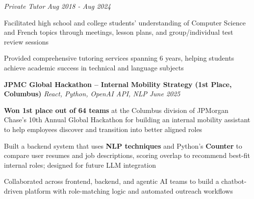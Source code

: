 \documentclass[letterpaper]{article}
\begin{document}
    \textit{Private Tutor} \hfill \textsl{Aug 2018 - Aug 2024}\\
    \vspace{-7pt}
    \begin{tightitemize} \itemsep -1mm
        
            \item Facilitated high school and college students' understanding of Computer Science and French topics through meetings, lesson plans, and group/individual test review sessions
            
            \item Provided comprehensive tutoring services spanning 6 years, helping students achieve academic success in technical and language subjects

    \end{tightitemize}
    \vspace{-2mm}


    {\textbf{JPMC Global Hackathon – Internal Mobility Strategy (1st Place, Columbus)}} {\sl React, Python, OpenAI API, NLP} \hfill \textsl{June 2025} \\
    \vspace{-2mm}
    \begin{tightitemize} \itemsep -1mm
        \item \textbf{Won 1st place out of 64 teams} at the Columbus division of JPMorgan Chase's 10th Annual Global Hackathon for building an internal mobility assistant to help employees discover and transition into better aligned roles
        \item Built a backend system that uses \textbf{NLP techniques} and Python's \textbf{Counter} to compare user resumes and job descriptions, scoring overlap to recommend best-fit internal roles; designed for future LLM integration
        \item Collaborated across frontend, backend, and agentic AI teams to build a chatbot-driven platform with role-matching logic and automated outreach workflows
    \end{tightitemize}
\end{document}
